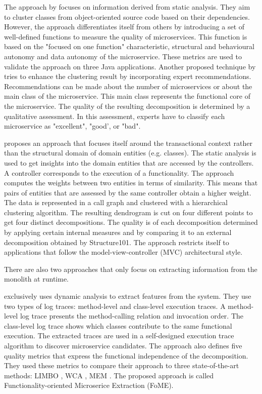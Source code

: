 The approach by \citeauthor{selmadji2018re} \cite{selmadji2018re} focuses on information derived from static analysis. They aim to cluster classes from object-oriented source code based on their dependencies. However, the approach differentiates itself from others by introducing a set of well-defined functions to measure the quality of microservices. This function is based on the "focused on one function" characteristic, structural and behavioural autonomy and data autonomy of the microservice. These metrics are used to validate the approach on three Java applications.
Another proposed technique by \citeauthor{selmadji2020monolithic} \cite{selmadji2020monolithic} tries to enhance the clustering result by incorporating expert recommendations. Recommendations can be made about the number of microservices or about the main class of the microservice. This main class represents the functional core of the microservice. The quality of the resulting decomposition is determined by a qualitative assessment. In this assessment, experts have to classify each microservice as "excellent", "good', or "bad". \par
\citeauthor{nunes2019monolith} \cite{nunes2019monolith} proposes an approach that focuses itself around the transactional context rather than the structural domain of domain entities (e.g. classes). The static analysis is used to get insights into the domain entities that are accessed by the controllers. A controller corresponds to the execution of a functionality. The approach computes the weights between two entities in terms of similarity. This means that pairs of entities that are assessed by the same controller obtain a higher weight. The data is represented in a call graph and clustered with a hierarchical clustering algorithm. The resulting dendrogram is cut on four different points to get four distinct decompositions. The quality is of each decomposition determined by applying certain internal measures and by comparing it to an external decomposition obtained by Structure101. The approach restricts itself to applications that follow the model-view-controller (MVC) architectural style. \par
There are also two approaches that only focus on extracting information from the monolith at runtime. \par
\citeauthor{jin2018functionality} \cite{jin2018functionality} exclusively uses dynamic analysis to extract features from the system. They use two types of log traces: method-level and class-level execution traces. A method-level log trace presents the method-calling relation and invocation order. The class-level log trace shows which classes contribute to the same functional execution. The extracted traces are used in a self-designed execution trace algorithm to discover microservice candidates. The approach also defines five quality metrics that express the functional independence of the decomposition. They used these metrics to compare their approach to three state-of-the-art methods: LIMBO \cite{andritsos2005information}, WCA \cite{chatterjee2002wca}, MEM \cite{mazlami2017extraction}. The proposed approach is called Functionality-oriented Microserice Extraction (FoME). \par
